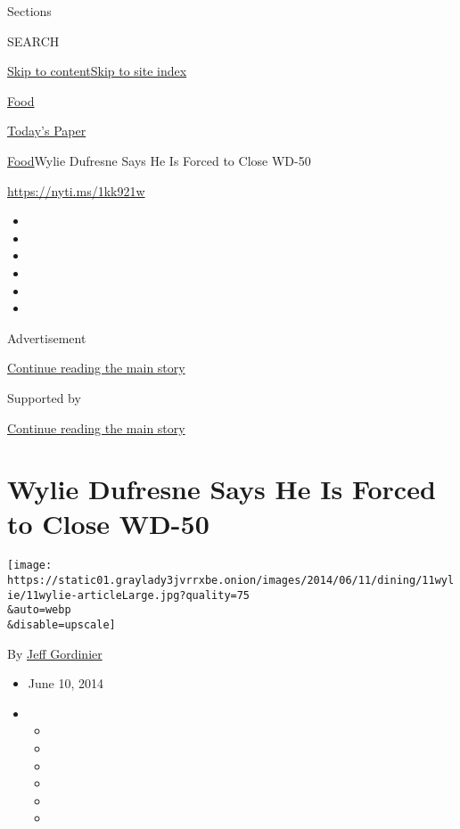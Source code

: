 Sections

SEARCH

\protect\hyperlink{site-content}{Skip to
content}\protect\hyperlink{site-index}{Skip to site index}

\href{https://www.nytimes3xbfgragh.onion/section/food}{Food}

\href{https://myaccount.nytimes3xbfgragh.onion/auth/login?response_type=cookie\&client_id=vi}{}

\href{https://www.nytimes3xbfgragh.onion/section/todayspaper}{Today's
Paper}

\href{/section/food}{Food}\textbar{}Wylie Dufresne Says He Is Forced to
Close WD-50

\url{https://nyti.ms/1kk921w}

\begin{itemize}
\item
\item
\item
\item
\item
\item
\end{itemize}

Advertisement

\protect\hyperlink{after-top}{Continue reading the main story}

Supported by

\protect\hyperlink{after-sponsor}{Continue reading the main story}

\hypertarget{wylie-dufresne-says-he-is-forced-to-close-wd-50}{%
\section{Wylie Dufresne Says He Is Forced to Close
WD-50}\label{wylie-dufresne-says-he-is-forced-to-close-wd-50}}

\texttt{[image: https://static01.graylady3jvrrxbe.onion/images/2014/06/11/dining/11wylie/11wylie-articleLarge.jpg?quality=75\\\&auto=webp\\\&disable=upscale]}

By \href{http://www.nytimes3xbfgragh.onion/by/jeff-gordinier}{Jeff
Gordinier}

\begin{itemize}
\item
  June 10, 2014
\item
  \begin{itemize}
  \item
  \item
  \item
  \item
  \item
  \item
  \end{itemize}
\end{itemize}

